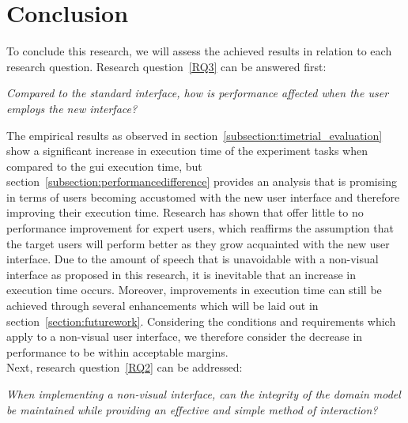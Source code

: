 \chapter{Conclusion}
\label{chapter:conclusion}
To conclude this research, we will assess the achieved results in relation to each research question. Research question~\ref{RQ3} can be answered first:

\begin{displayquote}
	\textit{Compared to the standard interface, how is performance affected when the user employs the new interface?}
\end{displayquote}

The empirical results as observed in section~\ref{subsection:timetrial_evaluation} show a significant increase in execution time of the experiment tasks when compared to the \acrshort{gui} execution time, but section~\ref{subsection:performancedifference} provides an analysis that is promising in terms of users becoming accustomed with the new user interface and therefore improving their execution time. Research has shown that  offer little to no performance improvement for expert users\cite{chen2007comparing}, which reaffirms the assumption that the target users will perform better as they grow acquainted with the new user interface. Due to the amount of speech that is unavoidable with a non-visual interface as proposed in this research, it is inevitable that an increase in execution time occurs. Moreover, improvements in execution time can still be achieved through several enhancements which will be laid out in section~\ref{section:futurework}. Considering the conditions and requirements which apply to a non-visual user interface, we therefore consider the decrease in performance to be within acceptable margins.\\
\newline
\noindent Next, research question~\ref{RQ2} can be addressed:

\begin{displayquote}
	\textit{When implementing a non-visual interface, can the integrity of the domain model be maintained while providing an effective and simple method of interaction?}
\end{displayquote}

